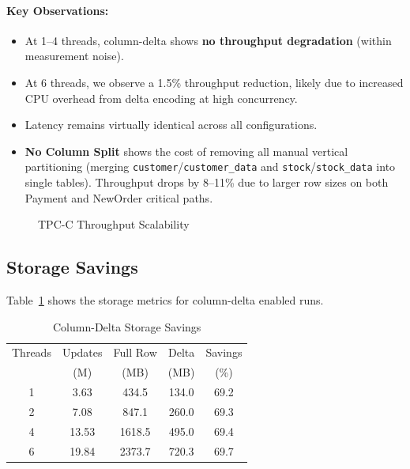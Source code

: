 \documentclass[letterpaper,twocolumn,10pt]{article}
\begin{document}
\paragraph{Key Observations:}
\begin{itemize}
\item At 1--4 threads, column-delta shows \textbf{no throughput degradation} (within measurement noise).
\item At 6 threads, we observe a 1.5\% throughput reduction, likely due to increased CPU overhead from delta encoding at high concurrency.
\item Latency remains virtually identical across all configurations.
\item \textbf{No Column Split} shows the cost of removing all manual vertical partitioning (merging \texttt{customer}/\texttt{customer\_data} and \texttt{stock}/\texttt{stock\_data} into single tables). Throughput drops by 8--11\% due to larger row sizes on both Payment and NewOrder critical paths.
\end{itemize}

\begin{figure}[t]
\centering
{}
\caption{TPC-C Throughput Scalability}
\label{fig:throughput}
\end{figure}

\subsection{Storage Savings}

Table~\ref{tab:storage} shows the storage metrics for column-delta enabled runs.

\begin{table}[t]
\centering
\caption{Column-Delta Storage Savings}
\label{tab:storage}
\begin{tabular}{ccccc}
\toprule
Threads & Updates & Full Row & Delta & Savings \\
& (M) & (MB) & (MB) & (\%) \\
\midrule
1 & 3.63 & 434.5 & 134.0 & 69.2 \\
2 & 7.08 & 847.1 & 260.0 & 69.3 \\
4 & 13.53 & 1618.5 & 495.0 & 69.4 \\
6 & 19.84 & 2373.7 & 720.3 & 69.7 \\
\bottomrule
\end{tabular}
\end{table}
\end{document}
